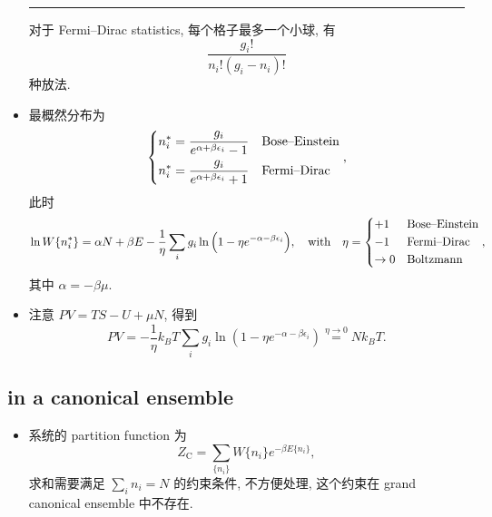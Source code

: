\begin{itemize}
\begin{tcolorbox}[title=calculation:]
		\noindent\rule[0.5ex]{\linewidth}{0.5pt} %
		
		对于 Fermi--Dirac statistics, 每个格子最多一个小球, 有
		\begin{equation}
			\frac{g_i!}{n_i! (g_i - n_i)!}
		\end{equation}
		种放法.
	\end{tcolorbox}
	
	\item 最概然分布为
	\begin{equation}
		\begin{dcases}
			n_i^* = \frac{g_i}{e^{\alpha + \beta \epsilon_i} - 1} & \text{Bose--Einstein} \\
			n_i^* = \frac{g_i}{e^{\alpha + \beta \epsilon_i} + 1} & \text{Fermi--Dirac}
		\end{dcases},
	\end{equation}
	此时
	\begin{equation}
		\ln W\{n_i^*\} = \alpha N + \beta E - \frac{1}{\eta} \sum_i g_i \ln \Big( 1 - \eta e^{- \alpha - \beta \epsilon_i} \Big), \quad \text{with} \quad \eta = \begin{dcases}
			+ 1 & \text{Bose--Einstein} \\
			- 1 & \text{Fermi--Dirac} \\
			\rightarrow 0 & \text{Boltzmann}
		\end{dcases},
	\end{equation}
	其中 $\alpha = - \beta \mu$.
	
	\item 注意 $P V = T S - U + \mu N$, 得到
	\begin{equation} \label{6.1.8}
		P V = - \frac{1}{\eta} k_B T \sum_i g_i \ln(1 - \eta e^{- \alpha - \beta \epsilon_i}) \overset{\eta \rightarrow 0}{=} N k_B T.
	\end{equation}
\end{itemize}

\subsection{in a canonical ensemble}
\begin{itemize}
	\item 系统的 partition function 为
	\begin{equation}
		Z_\text{C} = \sum_{\{n_i\}} W\{n_i\} e^{- \beta E\{n_i\}},
	\end{equation}
	求和需要满足 $\sum_i n_i = N$ 的约束条件, 不方便处理, 这个约束在 grand canonical ensemble 中不存在.
\end{itemize}

